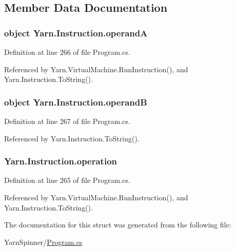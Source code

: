 \subsection{Member Data Documentation}
\hypertarget{a00119_ab5d386faa0d3dbc23db80f8e62706afd}{
\subsubsection[{operand\-A}]{\setlength{\rightskip}{0pt plus 5cm}object Yarn.\-Instruction.\-operand\-A}}\label{a00119_ab5d386faa0d3dbc23db80f8e62706afd}


Definition at line 266 of file Program.\-cs.



Referenced by Yarn.\-Virtual\-Machine.\-Run\-Instruction(), and Yarn.\-Instruction.\-To\-String().

\hypertarget{a00119_a56348c6fe7eb919b7277afc06e5b224a}{
\subsubsection[{operand\-B}]{\setlength{\rightskip}{0pt plus 5cm}object Yarn.\-Instruction.\-operand\-B}}\label{a00119_a56348c6fe7eb919b7277afc06e5b224a}


Definition at line 267 of file Program.\-cs.



Referenced by Yarn.\-Instruction.\-To\-String().

\hypertarget{a00119_a566bf5f7198cc353ea5c3710cb3a31cb}{
\subsubsection[{operation}]{ Yarn.\-Instruction.\-operation}}\label{a00119_a566bf5f7198cc353ea5c3710cb3a31cb}


Definition at line 265 of file Program.\-cs.



Referenced by Yarn.\-Virtual\-Machine.\-Run\-Instruction(), and Yarn.\-Instruction.\-To\-String().



The documentation for this struct was generated from the following file\-:\begin{DoxyCompactItemize}
\item 
Yarn\-Spinner/\hyperlink{a00314}{Program.\-cs}\end{DoxyCompactItemize}
